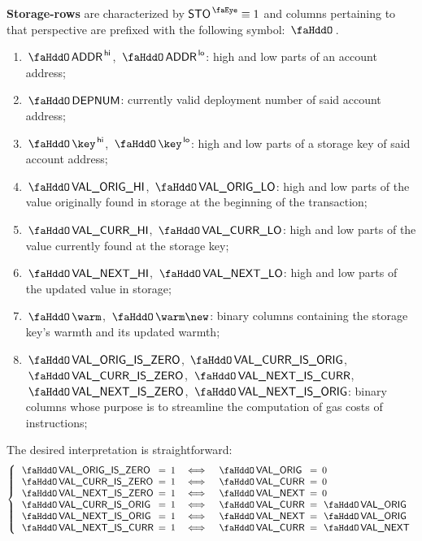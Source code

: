 \textbf{Storage-rows} are characterized by $\peekStorage \equiv 1$ and columns pertaining to that perspective are prefixed with the following symbol: $\storageSignifier$.
\begin{enumerate}
	\item
		$\stoAddressHi$,
		$\stoAddressLo$:
		high and low parts of an account address;
	\item
		$\stoDeploymentNumber$:
		currently valid deployment number of said account address;
	\item
		$\stoKeyHi$,
		$\stoKeyLo$:
		high and low parts of a storage key of said account address;
	\item
		$\stoOrigValueHi$,
		$\stoOrigValueLo$:
		high and low parts of the value originally found in storage at the beginning of the transaction;
	\item
		$\stoCurrValueHi$,
		$\stoCurrValueLo$:
		high and low parts of the value currently found at the storage key;
	\item
		$\stoNextValueHi$,
		$\stoNextValueLo$:
		high and low parts of the updated value in storage;
	\item
		$\stoWarmth$,
		$\stoWarmth\new$:
		binary columns containing the storage key's warmth and its updated warmth; 
	\item
		$\stoOrigValueIsZero$,
		$\stoCurrValueIsOrig$,
		$\stoCurrValueIsZero$,
		$\stoNextValueIsCurr$,
		$\stoNextValueIsZero$,
		$\stoNextValueIsOrig$:
		binary columns whose purpose is to streamline the computation of gas costs of  instructions;
\end{enumerate}
The desired interpretation is straightforward:
\[
	\left\{ \begin{array}{lclclcl}
		\stoOrigValueIsZero & \!\!\! = \!\!\! & 1 & \iff & \stoOrigValue & \!\!\! = \!\!\! & 0           \\
		\stoCurrValueIsZero & \!\!\! = \!\!\! & 1 & \iff & \stoCurrValue & \!\!\! = \!\!\! & 0           \\
		\stoNextValueIsZero & \!\!\! = \!\!\! & 1 & \iff & \stoNextValue & \!\!\! = \!\!\! & 0           \\
		\stoCurrValueIsOrig & \!\!\! = \!\!\! & 1 & \iff & \stoCurrValue & \!\!\! = \!\!\! & \stoOrigValue \\
		\stoNextValueIsOrig & \!\!\! = \!\!\! & 1 & \iff & \stoNextValue & \!\!\! = \!\!\! & \stoOrigValue \\
		\stoNextValueIsCurr & \!\!\! = \!\!\! & 1 & \iff & \stoCurrValue & \!\!\! = \!\!\! & \stoNextValue \\
	\end{array} \right.
\]
